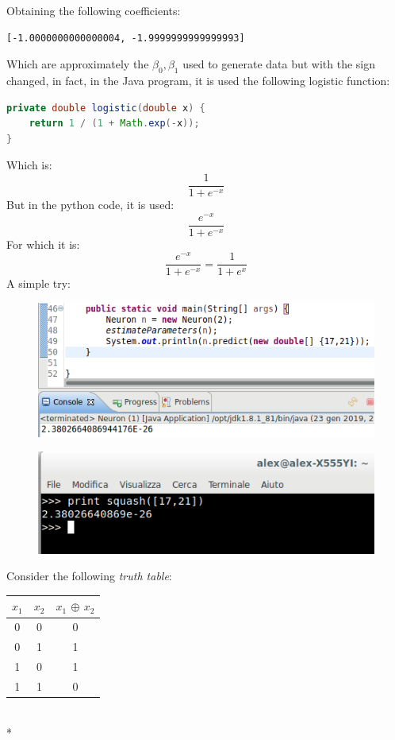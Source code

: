 \documentclass[10pt,a4paper]{article}
\begin{document}
Obtaining the following coefficients:
\begin{lstlisting}
[-1.0000000000000004, -1.9999999999999993]
\end{lstlisting}
Which are approximately the $\beta_0,\beta_1$ used to generate data but with the sign changed, in fact, in the Java program, it is used the following logistic function:
\begin{lstlisting}[language = Java]
private double logistic(double x) {
	return 1 / (1 + Math.exp(-x));
}
\end{lstlisting}
Which is:
$$
\frac{1}{1+e^{-x}}
$$
But in the python code, it is used:
$$
\frac{e^{-x}}{1+e^{-x}}
$$
For which it is:
$$
\frac{e^{-x}}{1+e^{-x}} = \frac{1}{1 + e^x}
$$
A simple try:
\begin{figure}[h]
	\centering
	\includegraphics[scale=2]{img/logregpred}
	\label{fig:logregpred}
\end{figure}
\begin{figure}[h]
	\centering
	\includegraphics[width=0.7\linewidth]{img/logregpredpython}
	\label{fig:logregpredpy}
\end{figure}\newpage \noindent
Consider the following \emph{truth table}:
\begin{center}
\begin{tabular}{|c|c|c|}
	\hline 
	$x_1$ & $x_2$ & $x_1$ $\oplus$ $x_2$ \\ 
	\hline 
	0 & 0 & 0 \\ 
	\hline 
	0 & 1 & 1 \\ 
	\hline 
	1 & 0 & 1 \\ 
	\hline 
	1 & 1 & 0 \\ 
	\hline 
\end{tabular}\\*
\end{center} 
\end{document}

